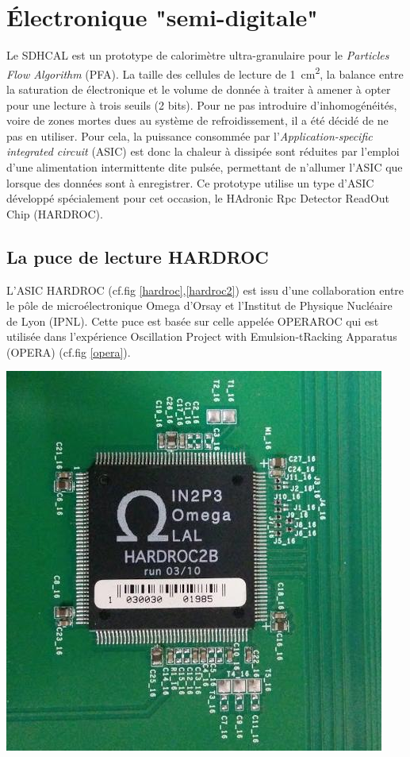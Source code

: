 \section{Électronique "semi-digitale"}
Le SDHCAL est un prototype de calorimètre ultra-granulaire pour le \textit{Particles Flow Algorithm} (PFA). La taille des cellules de lecture de \SI{1}{\square\centi\meter}, la balance entre la saturation de électronique et le volume de donnée à traiter à amener à opter pour une lecture à trois seuils (\num{2} bits). Pour ne pas introduire d'inhomogénéités, voire de zones mortes dues au système de refroidissement, il a été décidé de ne pas en utiliser. Pour cela, la puissance consommée par l'\textit{Application-specific integrated circuit} (ASIC) est donc la chaleur à dissipée sont réduites par l'emploi d'une alimentation intermittente dite pulsée, permettant de n'allumer l'ASIC que lorsque des données sont à enregistrer. Ce prototype utilise un type d'ASIC développé spécialement pour cet occasion, le HAdronic Rpc Detector ReadOut Chip (HARDROC)\cite{Dulucq:2010ssa}.

\subsection{La puce de lecture HARDROC}
L'ASIC HARDROC (cf.fig \ref{hardroc},\ref{hardroc2}) est issu d'une collaboration entre le pôle de microélectronique Omega d'Orsay et l'Institut de Physique Nucléaire de Lyon (IPNL). Cette puce est basée sur celle appelée OPERAROC qui est utilisée dans l'expérience Oscillation Project with Emulsion-tRacking Apparatus (OPERA) (cf.fig \ref{opera}).

\marginpar
{
	\centering
	\includegraphics[width=\marginparwidth]{GLA/hardroc2.jpg}
	\label{hardroc2}
}

